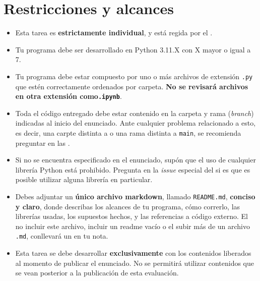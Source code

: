 \section{Restricciones y alcances}
\begin{itemize} 
    \item Esta tarea es \textbf{estrictamente individual}, y está regida por el .
    
    \item Tu programa debe ser desarrollado en Python 3.11.X  con X mayor o igual a 7.
    
    \item Tu programa debe estar compuesto por uno o más archivos de extensión \texttt{.py} que estén correctamente ordenados por carpeta. \textbf{No se revisará archivos en otra extensión como\texttt{.ipynb}}.

    \item Toda el código entregado debe estar contenido en la carpeta y rama (\textit{branch}) indicadas al inicio del enunciado. Ante cualquier problema relacionado a esto, es decir, una carpte distinta a  o una rama distinta a \texttt{main}, se recomienda preguntar en las .

    \item Si no se encuentra especificado en el enunciado, supón que el uso de cualquier librería Python está prohibido. Pregunta en la \textit{issue} especial del  si es que es posible utilizar alguna librería en particular.
    \item Debes adjuntar un \textbf{único archivo markdown}, llamado \texttt{README.md}, \textbf{conciso y claro}, donde describas los alcances de tu programa, cómo correrlo, las librerías usadas, los supuestos hechos, y las referencias a código externo. El no incluir este archivo, incluir un readme vacío o el subir más de un archivo \texttt{.md}, conllevará un  en tu nota.

    \item Esta tarea se debe desarrollar \textbf{exclusivamente} con los contenidos liberados al momento de publicar el enunciado. No se permitirá utilizar contenidos que se vean posterior a la publicación de esta evaluación. 


\end{itemize}
